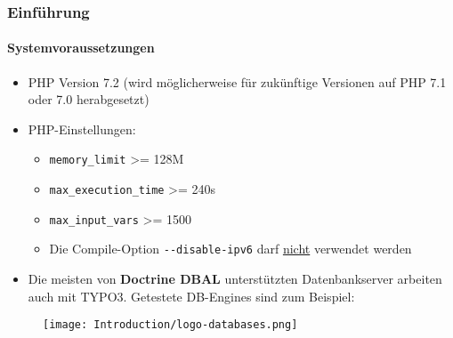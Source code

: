 \begin{frame}[fragile]
	\frametitle{Einführung}
	\framesubtitle{Systemvoraussetzungen}

	\begin{itemize}
		\item PHP Version 7.2\newline
			\smaller
				(wird möglicherweise für zukünftige Versionen auf PHP 7.1 oder 7.0 herabgesetzt)
			\normalsize

		\item PHP-Einstellungen:

			\begin{itemize}
				\item \texttt{memory\_limit} >= 128M
				\item \texttt{max\_execution\_time} >= 240s
				\item \texttt{max\_input\_vars} >= 1500
				\item Die Compile-Option \texttt{-}\texttt{-disable-ipv6} darf \underline{nicht} verwendet werden
			\end{itemize}

		\item Die meisten von \textbf{Doctrine DBAL} unterstützten Datenbankserver arbeiten auch mit TYPO3.
			Getestete DB-Engines sind zum Beispiel:
	\end{itemize}

	\begin{figure}
		\texttt{[image: Introduction/logo-databases.png]}
	\end{figure}

\end{frame}

